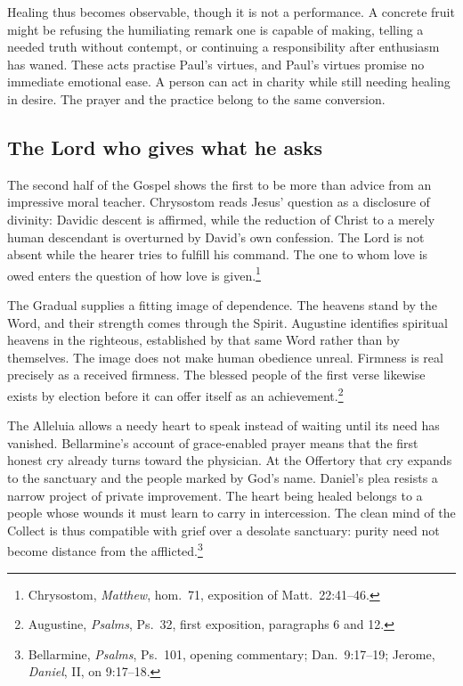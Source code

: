Healing thus becomes observable, though it is not a performance. A concrete fruit might be refusing the humiliating remark one is capable of making, telling a needed truth without contempt, or continuing a responsibility after enthusiasm has waned. These acts practise Paul's virtues, and Paul's virtues promise no immediate emotional ease. A person can act in charity while still needing healing in desire. The prayer and the practice belong to the same conversion.

\subsection{The Lord who gives what he asks}
The second half of the Gospel shows the first to be more than advice from an impressive moral teacher. Chrysostom reads Jesus' question as a disclosure of divinity: Davidic descent is affirmed, while the reduction of Christ to a merely human descendant is overturned by David's own confession. The Lord is not absent while the hearer tries to fulfill his command. The one to whom love is owed enters the question of how love is given.\footnote{Chrysostom, \textit{Matthew}, hom.~71, exposition of Matt.~22:41--46.}

The Gradual supplies a fitting image of dependence. The heavens stand by the Word, and their strength comes through the Spirit. Augustine identifies spiritual heavens in the righteous, established by that same Word rather than by themselves. The image does not make human obedience unreal. Firmness is real precisely as a received firmness. The blessed people of the first verse likewise exists by election before it can offer itself as an achievement.\footnote{Augustine, \textit{Psalms}, Ps.~32, first exposition, paragraphs 6 and 12.}

The Alleluia allows a needy heart to speak instead of waiting until its need has vanished. Bellarmine's account of grace-enabled prayer means that the first honest cry already turns toward the physician. At the Offertory that cry expands to the sanctuary and the people marked by God's name. Daniel's plea resists a narrow project of private improvement. The heart being healed belongs to a people whose wounds it must learn to carry in intercession. The clean mind of the Collect is thus compatible with grief over a desolate sanctuary: purity need not become distance from the afflicted.\footnote{Bellarmine, \textit{Psalms}, Ps.~101, opening commentary; Dan.~9:17--19; Jerome, \textit{Daniel}, II, on 9:17--18.}

